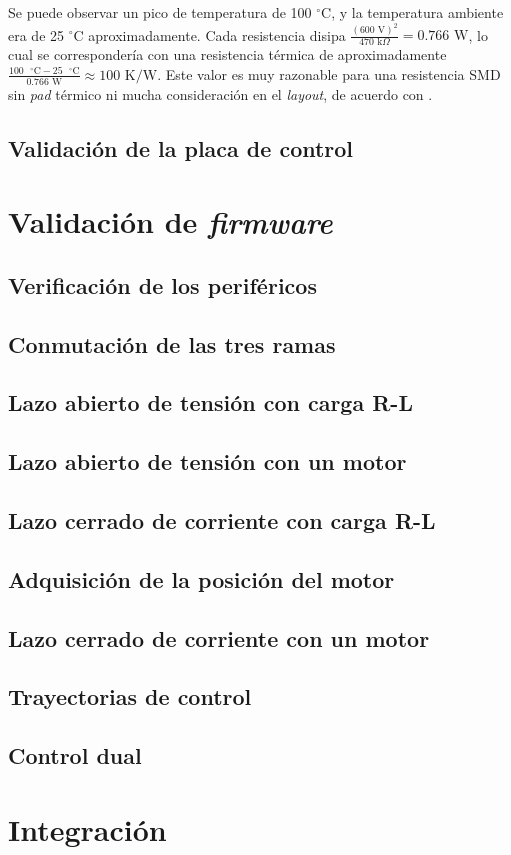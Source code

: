 Se puede observar un pico de temperatura de 100 $^{\circ}$C, y la temperatura ambiente era de 25 $^{\circ}$C aproximadamente. Cada resistencia disipa $\frac{(600 \text{ V})^2}{470 \text{ k}\Omega} = 0.766 \text{ W}$, lo cual se correspondería con una resistencia térmica de aproximadamente $ \frac{100 \text{ }^{\circ}\text{C} - 25 \text{ }^{\circ}\text{C}}{0.766 \text{ W}} \approx 100 \text{ K/W}$. Este valor es muy razonable para una resistencia SMD sin \textit{pad} térmico ni mucha consideración en el \textit{layout}, de acuerdo con \cite{vishay_application_note}.

\subsection{Validación de la placa de control}


\section{Validación de \textit{firmware}}
\subsection{Verificación de los periféricos}

\subsection{Conmutación de las tres ramas}

\subsection{Lazo abierto de tensión con carga R-L}

\subsection{Lazo abierto de tensión con un motor}

\subsection{Lazo cerrado de corriente con carga R-L}

\subsection{Adquisición de la posición del motor}

\subsection{Lazo cerrado de corriente con un motor}

\subsection{Trayectorias de control}

\subsection{Control dual}

\section{Integración}
